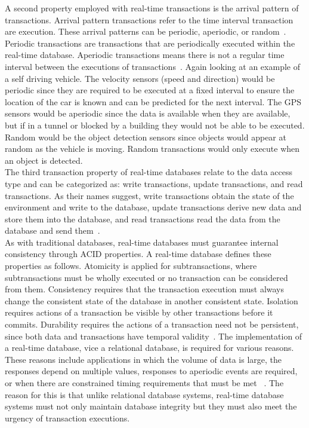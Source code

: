 \documentclass[conference]{IEEEtran}
\begin{document}
\indent A second property employed with real-time transactions is the arrival pattern of transactions. Arrival pattern transactions refer to the time interval transaction are execution. These arrival patterns can be periodic, aperiodic, or random~\cite{Erickson}.  Periodic transactions are transactions that are periodically executed within the real-time database. Aperiodic transactions means there is not a regular time interval between the executions of transactions~\cite{Erickson}. Again looking at an example of a self driving vehicle. The velocity sensors (speed and direction) would be periodic since they are required to be executed at a fixed interval to ensure the location of the car is known and can be predicted for the next interval. The GPS sensors would be aperiodic since the data is available when they are available, but if in a tunnel or blocked by a building they would not be able to be executed. Random would be the object detection sensors since objects would appear at random as the vehicle is moving. Random transactions would only execute when an object is detected.\\
\indent The third transaction property of real-time databases relate to the data access type and can be categorized as: write transactions, update transactions, and read transactions. As their names suggest, write transactions obtain the state of the environment and write to the database, update transactions derive new data and store them into the database, and read transactions read the data from the database and send them~\cite{Erickson}.\\
\indent As with traditional databases, real-time databases must guarantee internal consistency through ACID properties. A real-time database defines these properties as follows. Atomicity is applied for subtransactions, where subtransactions must be wholly executed or no transaction can be considered from them. Consistency requires that the transaction execution must always change the consistent state of the database in another consistent state. Isolation requires actions of a transaction be visible by other transactions before it commits. Durability requires the actions of a transaction need not be persistent, since both data and transactions have temporal validity~\cite{Halpin}.
\indent The implementation of a real-time database, vice a relational database, is required for various reasons. These reasons include applications in which the volume of data is large, the responses depend on multiple values, responses to aperiodic events are required, or when there are constrained timing requirements that must be met ~\cite{Halpin}.  The reason for this is that unlike relational database systems, real-time database systems must not only maintain database integrity but they must also meet the urgency of transaction executions.
\end{document}
